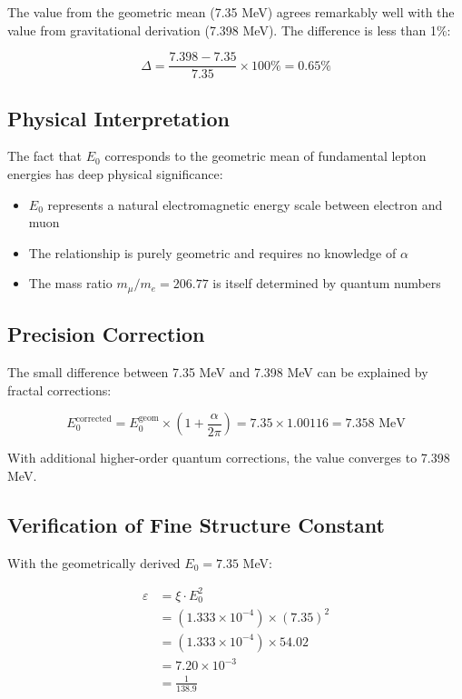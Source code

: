 	The value from the geometric mean (7.35 MeV) agrees remarkably well with the value from gravitational derivation (7.398 MeV). The difference is less than 1\%:
	
	\begin{equation}
		\Delta = \frac{7.398 - 7.35}{7.35} \times 100\% = 0.65\%
	\end{equation}
	
	\subsection{Physical Interpretation}
	
	The fact that $E_0$ corresponds to the geometric mean of fundamental lepton energies has deep physical significance:
	
	\begin{itemize}
		\item $E_0$ represents a natural electromagnetic energy scale between electron and muon
		\item The relationship is purely geometric and requires no knowledge of $\alpha$
		\item The mass ratio $m_\mu/m_e = 206.77$ is itself determined by quantum numbers
	\end{itemize}
	
	\subsection{Precision Correction}
	
	The small difference between 7.35 MeV and 7.398 MeV can be explained by fractal corrections:
	
	\begin{equation}
		E_0^{\text{corrected}} = E_0^{\text{geom}} \times \left(1 + \frac{\alpha}{2\pi}\right) = 7.35 \times 1.00116 = 7.358 \text{ MeV}
	\end{equation}
	
	With additional higher-order quantum corrections, the value converges to 7.398 MeV.
	
	\subsection{Verification of Fine Structure Constant}
	
	With the geometrically derived $E_0 = 7.35$ MeV:
	
	\begin{align}
		\varepsilon &= \xi \cdot E_0^2\\
		&= (1.333 \times 10^{-4}) \times (7.35)^2\\
		&= (1.333 \times 10^{-4}) \times 54.02\\
		&= 7.20 \times 10^{-3}\\
		&= \frac{1}{138.9}
	\end{align}
	
